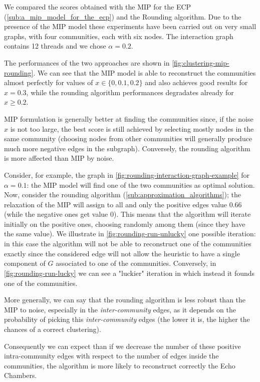 We compared the scores obtained with the \acrshort{MIP} for the \acrshort{ECP}
(\autoref{sub:a_mip_model_for_the_ecp}) and the Rounding algorithm. Due to the presence of the
\acrshort{MIP} model these experiments have been carried out on very
small graphs, with four communities, each with six nodes. The interaction graph
contains 12 threads and we chose $\alpha = 0.2$.

The performances of the two approaches are shown in
\autoref{fig:clustering-mip-rounding}. We can see that the MIP model is able to
reconstruct the communities almost perfectly for values of $x \in \{0, 0.1,
	0.2\}$ and also achieves good results for $x = 0.3$, while the rounding
algorithm performances degradates already for $x \geq 0.2$.

MIP formulation is generally better at finding the communities since, if
the noise $x$ is not too large, the best score is still achieved
by selecting mostly nodes in the same community (choosing nodes from other
communities will generally produce much more negative edges in the subgraph).
Conversely, the rounding algorithm is more affected than MIP by noise.

Consider, for example, the graph in
\autoref{fig:rounding-interaction-graph-example} for $\alpha = 0.1$:
the MIP model will find one of the two communities as optimal solution.
Now, consider the rounding algorithm (\autoref{sub:approximation_algorithms});
the relaxation of the MIP will assign to all and only the positive edges value
$0.66$ (while the negative ones get value $0$). This means that the algorithm
will iterate initially on the positive ones, choosing randomly among them (since they have the same value).
We illustrate in \autoref{fig:rounding-run-unlucky} one possible iteration: in
this case the algorithm will not be able to reconstruct one of the communities
exactly since the considered edge will not allow the heuristic to have a single component of
$\hat{G}$ associated to one of the communities.
Conversely, in \autoref{fig:rounding-run-lucky} we can see a "luckier"
iteration in which instead it founds one of the communities.

More generally, we can say that the rounding algorithm is less robust than the MIP
to noise, especially in the \emph{inter-community} edges, as it
depends on the probability of picking this \emph{inter-community} edges (the
lower it is, the higher the chances of a correct clustering).

Consequently we can expect than if we decrease the number of these positive
intra-community edges with respect to the number of edges inside the
communities, the algorithm is more likely to reconstruct correctly the Echo
Chambers.

